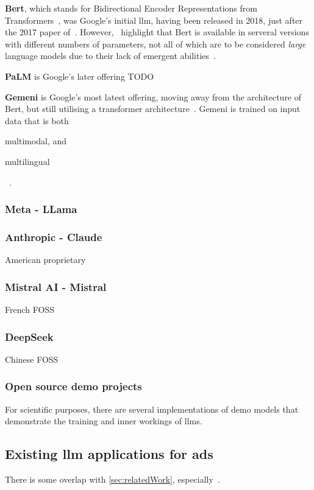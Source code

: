 \textbf{Bert}, which stands for Bidirectional Encoder Representations from
Transformers~\cite{bertPaper}, was Google's initial \acrshort{llm}, having been released in 2018,
just after the 2017 paper of~\citeauthor{attentionIsAllYouNeed}. However,~\citeauthor{llmSurvey}
highlight that Bert is available in serveral versions with different numbers of parameters, not all
of which are to be considered \textit{large} language models due to their lack of emergent
abilities~\cite[1, 3, 86]{llmSurvey}.

\textbf{PaLM} is Google's later offering TODO

\textbf{Gemeni} is Google's most latest offering, moving away from the architecture of Bert, but
still utilising a transformer architecture~\cite[3]{gemeniReport}. Gemeni is trained on input data
that is both \begin{inparaenum}
    \item multimodal, and
    \item multilingual
\end{inparaenum}~\cite[5]{gemeniReport}.

\subsubsection*{Meta - LLama}


\subsubsection*{Anthropic - Claude}

American proprietary

\subsubsection*{Mistral AI - Mistral}

French FOSS

\subsubsection*{DeepSeek}

Chinese  FOSS

\subsubsection*{Open source demo projects}

For scientific purposes, there are several implementations of demo models that demonstrate the
training and inner workings of \acrshort{llms}.



\subsection{Existing \acrshort{llm} applications for \acrshort{ads}}

There is some overlap with \cref{sec:relatedWork}, especially~\cite{autoSceneGen}.

